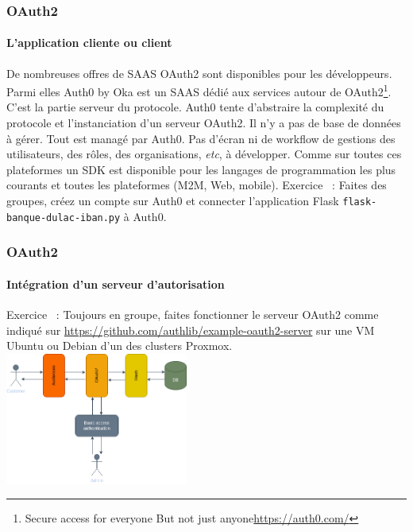 \documentclass{beamer}
\begin{document}
    \begin{frame}
        \frametitle{OAuth2}
        \framesubtitle{L'application cliente ou client}
        \transdissolve
        De nombreuses offres de SAAS OAuth2 sont disponibles pour les développeurs.
        Parmi elles Auth0 by Oka est un SAAS dédié aux services autour de OAuth2\footnote{Secure access for everyone But not just anyone\url{https://auth0.com/}}.
        \bigbreak
        C'est la partie serveur du protocole.
        Auth0 tente d'abstraire la complexité du protocole et l'instanciation d'un serveur OAuth2.
        Il n'y a pas de base de données à gérer.
        Tout est managé par Auth0.
        Pas d'écran ni de workflow de gestions des utilisateurs, des rôles, des organisations, \textit{etc}, à développer.
        \bigbreak
        Comme sur toutes ces plateformes un SDK est disponible pour les langages de programmation les plus courants et toutes les plateformes (M2M, Web, mobile).
        \bigbreak
        Exercice \execcounterdispinc{}~: Faites des groupes, créez un compte sur Auth0 et connecter l'application Flask \lstinline{flask-banque-dulac-iban.py} à Auth0.
    \end{frame}

    \begin{frame}
        \frametitle{OAuth2}
        \framesubtitle{Intégration d'un serveur d'autorisation}
        \transdissolve
        Exercice \execcounterdispinc{}~:
        Toujours en groupe, faites fonctionner le serveur OAuth2 comme indiqué sur \url{https://github.com/authlib/example-oauth2-server} sur une VM Ubuntu ou Debian d'un des clusters Proxmox.
        \bigbreak
        \centering
        \includegraphics[width=6cm]{image/OAuth2-integration.drawio}
    \end{frame}
\end{document}
